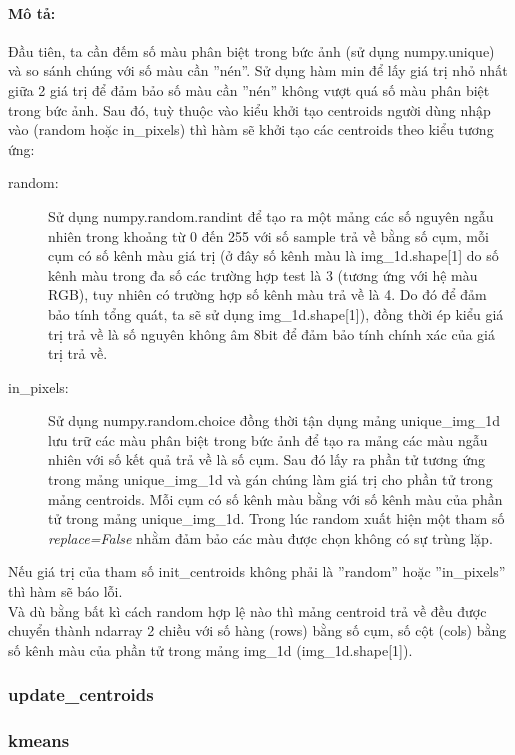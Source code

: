 \documentclass{article}
\begin{document}
\paragraph*{Mô tả:} Đầu tiên, ta cần đếm số màu phân biệt trong bức ảnh (sử dụng numpy.unique) và so sánh chúng với số màu cần ''nén''. Sử dụng hàm min để lấy giá trị nhỏ nhất giữa 2 giá trị để đảm bảo số màu cần ''nén'' không vượt quá số màu phân biệt trong bức ảnh. Sau đó, tuỳ thuộc vào kiểu khởi tạo centroids người dùng nhập vào (random hoặc in\_pixels) thì hàm sẽ khởi tạo các centroids theo kiểu tương ứng:
\begin{description}
  \item [random:] Sử dụng numpy.random.randint để tạo ra một mảng các số nguyên ngẫu nhiên trong khoảng từ 0 đến 255 với số sample trả về bằng số cụm, mỗi cụm có số kênh màu giá trị (ở đây số kênh màu là img\_1d.shape[1] do số kênh màu trong đa số các trường hợp test là 3 (tương ứng với hệ màu RGB), tuy nhiên có trường hợp số kênh màu trả về là 4. Do đó để đảm bảo tính tổng quát, ta sẽ sử dụng img\_1d.shape[1]), đồng thời ép kiểu giá trị trả về là số nguyên không âm 8bit để đảm bảo tính chính xác của giá trị trả về.
  \item [in\_pixels:] Sử dụng numpy.random.choice đồng thời tận dụng mảng unique\_img\_1d lưu trữ các màu phân biệt trong bức ảnh để tạo ra mảng các màu ngẫu nhiên với số kết quả trả về là số cụm. Sau đó lấy ra phần tử tương ứng trong mảng unique\_img\_1d và gán chúng làm giá trị cho phần tử trong mảng centroids. Mỗi cụm có số kênh màu bằng với số kênh màu của phần tử trong mảng unique\_img\_1d. Trong lúc random xuất hiện một tham số \textit{replace=False} nhằm đảm bảo các màu được chọn không có sự trùng lặp.
\end{description}
Nếu giá trị của tham số init\_centroids không phải là ''random'' hoặc ''in\_pixels'' thì hàm sẽ báo lỗi. \\

Và dù bằng bất kì cách random hợp lệ nào thì mảng centroid trả về đều được chuyển thành ndarray 2 chiều với số hàng (rows) bằng số cụm, số cột (cols) bằng số kênh màu của phần tử trong mảng img\_1d (img\_1d.shape[1]).

\subsubsection{update\_centroids}
\subsubsection{kmeans}
\end{document}
